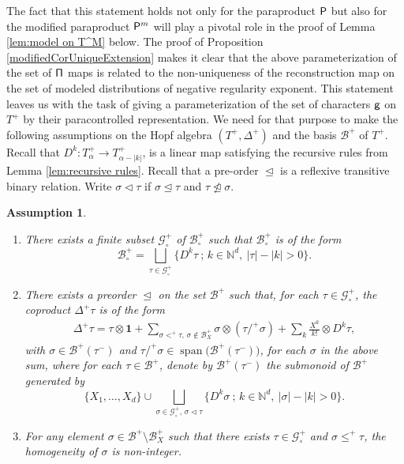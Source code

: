 \documentclass[11pt]{article}
\newcommand{\skpt}{\smallskip}
\numberwithin{equation}{section}
\DeclareMathOperator{\Span}{span}
\theoremstyle{plain}
\newtheorem{assumption}{Assumption}
\theoremstyle{definition}
\newcommand{\unit}{\mathbf{1}}
\let\pord\trianglelefteq
\let\spord\triangleleft
\newcommand{\mcB}{\mathcal{B}}
\newcommand{\mcG}{\mathcal{G}}
\begin{document}
The fact that this statement holds not only for the paraproduct $\sf P$ but also for the modified paraproduct ${\sf P}^m$ will play a pivotal role in the proof of Lemma \ref{lem:model on T^M} below. The proof of Proposition \ref{modifiedCorUniqueExtension} makes it clear that the above parameterization of the set of $\sf \Pi$ maps is related to the non-uniqueness of the reconstruction map on the set of modeled distributions of negative regularity exponent. This statement leaves us with the task of giving a parameterization of the set of characters $\sf g$ on $T^+$ by their paracontrolled representation. We need for that purpose to make the following assumptions on the Hopf algebra $(T^+,\Delta^+)$ and the basis $\mcB^+$ of $T^+$. Recall that $D^k:T_\alpha^+\to T_{\alpha-|k|}^+$, is a linear map satisfying the recursive rules from Lemma \ref{lem:recursive rules}. Recall that a pre-order $\pord$ is a reflexive transitive binary relation. Write $\sigma\spord\tau$ if $\sigma\pord\tau$ and $\tau\ntrianglelefteq\sigma$.

\skpt
\begin{assumption}\label{ass:C}
\begin{enumerate}
\item\label{ass:C1}
There exists a finite subset $\mcG_\circ^+$ of $\mcB_\circ^+$ such that $\mcB_\circ^+$ is of the form
\[
\mcB_\circ^+ = \bigsqcup_{\tau\in\mcG_\circ^+} \bigl\{D^k\tau\ ;\, k\in\mathbb{N}^d,\ |\tau|-|k|>0\bigr\}.
\]
	\item\label{ass:C2}
	There exists a preorder $\pord$ on the set $\mcB^+$ such that, for each $\tau\in\mcG_\circ^+$,
	the coproduct $\Delta^+\tau$ is of the form
\begin{align}\label{eq:canonical coproduct}
\Delta^+\tau=\tau\otimes\unit+\sum_{\sigma<^+\tau,\, \sigma\notin\mcB_X^+}\sigma\otimes(\tau/^+\sigma) + \sum_{k}\frac{X^{k}}{k!}\otimes D^k\tau,
\end{align}
with $\sigma\in\mcB^+(\tau^-)$ and $\tau/^+\sigma\in\Span\bigl(\mcB^+(\tau^-)\bigr)$, for each $\sigma$ in the above sum,
where for each $\tau\in\mcB^+$, denote by $\mcB^+(\tau^-)$ the submonoid of $\mcB^+$ generated by
\[
\big\{X_1,\dots,X_d\big\}\cup\bigsqcup_{\sigma\in\mcG_\circ^+,\, \sigma\spord\tau} \bigl\{D^k\sigma\ ;\, k\in\mathbb{N}^d,\ |\sigma|-|k|>0\bigr\}.
\]

\item\label{ass:C3}
For any element $\sigma\in\mcB^+\setminus\mcB_X^+$ such that there exists $\tau\in\mcG_\circ^+$ and $\sigma\le^+\tau$, the homogeneity of $\sigma$ is non-integer.
\end{enumerate}
\end{assumption}
\end{document}

